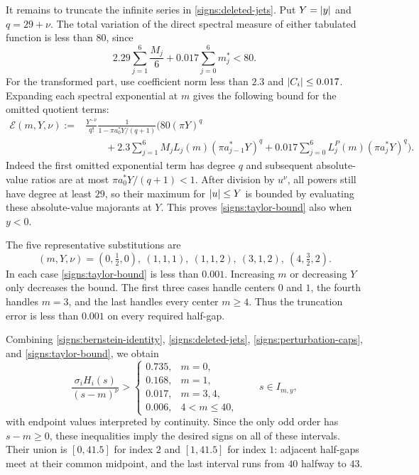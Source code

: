It remains to truncate the infinite series in
\eqref{signs:deleted-jets}.  Put $Y=\left\lvert y\right\rvert$ and $q=29+\nu$.
The total variation of the direct spectral measure of either tabulated
function is less than $80$, since
\[
  2.29\sum_{j=1}^6\frac{M_j}{6}
       +0.017\sum_{j=0}^6 m_j^*<80.
\]
For the transformed part, use coefficient norm less than $2.3$ and
$\left\lvert C_i\right\rvert\le0.017$.  Expanding each spectral exponential at $m$ gives
the following bound for the omitted quotient terms:
\begin{align}\label{signs:taylor-bound}
 \mathcal E(m,Y,\nu)
 := {}&\frac{Y^{-\nu}}{q!}
       \frac{1}{1-\pi a_0^*Y/(q+1)}
 \Bigg(80(\pi Y)^q
 \nonumber\\[-2pt]
 &\qquad+2.3\sum_{j=1}^6
       M_jL_j(m)(\pi a_{j-1}^*Y)^q
       +0.017\sum_{j=0}^6
       L_j^P(m)(\pi a_j^*Y)^q\Bigg).
\end{align}
Indeed the first omitted exponential term has degree $q$ and subsequent
absolute-value ratios are at most $\pi a_0^*Y/(q+1)<1$.
After division by $u^\nu$, all powers still have degree at least $29$,
so their maximum for $\left\lvert u\right\rvert\le Y$ is bounded by evaluating these
absolute-value majorants at $Y$.  This proves
\eqref{signs:taylor-bound} also when $y<0$.

The five representative substitutions are
\begin{equation}\label{signs:taylor-representatives}
 (m,Y,\nu)=(0,\tfrac12,0),\ (1,1,1),\ (1,1,2),\ (3,1,2),\
           (4,\tfrac32,2).
\end{equation}
In each case \eqref{signs:taylor-bound} is less than $0.001$.
Increasing $m$ or decreasing $Y$ only decreases the bound.  The first
three cases handle centers $0$ and $1$, the fourth handles $m=3$, and the
last handles every center $m\ge4$.  Thus the truncation error is less
than $0.001$ on every required half-gap.

Combining \eqref{signs:bernstein-identity},
\eqref{signs:deleted-jets}, \eqref{signs:perturbation-caps}, and
\eqref{signs:taylor-bound}, we obtain
\begin{equation}\label{signs:finite-quotient}
  \frac{\sigma_i H_i(s)}{(s-m)^\nu}
  >\begin{cases}
     0.735,&m=0,\\
     0.168,&m=1,\\
     0.017,&m=3,4,\\
     0.006,&4<m\le40,
    \end{cases}
  \qquad s\in I_{m,y},
\end{equation}
with endpoint values interpreted by continuity.  Since the only odd
order has $s-m\ge0$, these inequalities imply the desired signs on all
of these intervals.  Their union is $[0,41.5]$ for index $2$ and
$[1,41.5]$ for index $1$: adjacent half-gaps meet at their common
midpoint, and the last interval runs from $40$ halfway to $43$.

